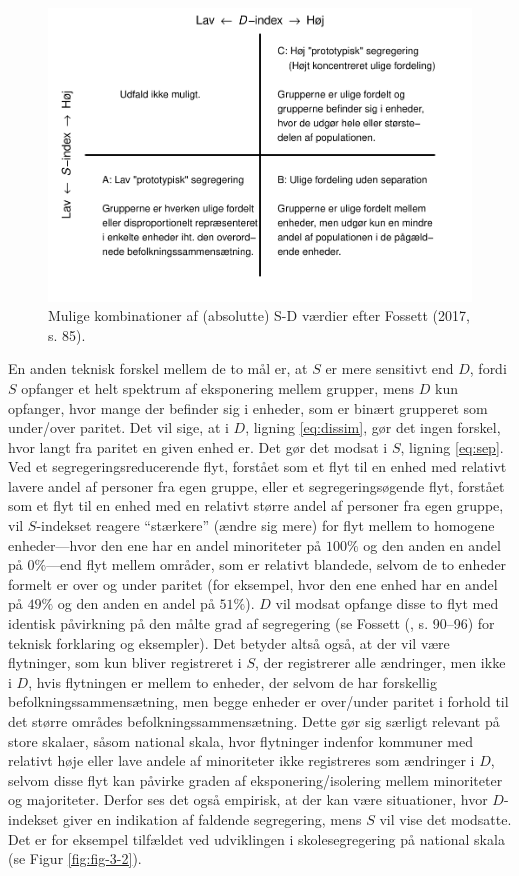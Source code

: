 \documentclass[
]{book}
\begin{document}
\begin{figure}
\includegraphics[width=1\linewidth]{en-befolkning-blander-sig_files/figure-latex/fig-9-4-1} \caption{Mulige kombinationer af (absolutte) S-D værdier efter Fossett (2017, s. 85).}\label{fig:fig-9-4}
\end{figure}

En anden teknisk forskel mellem de to mål er, at \(S\) er mere sensitivt end \(D\), fordi \(S\) opfanger et helt spektrum af eksponering mellem grupper, mens \(D\) kun opfanger, hvor mange der befinder sig i enheder, som er binært grupperet som under/over paritet. Det vil sige, at i \(D\), ligning \eqref{eq:dissim}, gør det ingen forskel, hvor langt fra paritet en given enhed er. Det gør det modsat i \(S\), ligning \eqref{eq:sep}. Ved et segregeringsreducerende flyt, forstået som et flyt til en enhed med relativt lavere andel af personer fra egen gruppe, eller et segregeringsøgende flyt, forstået som et flyt til en enhed med en relativt større andel af personer fra egen gruppe, vil \(S\)-indekset reagere ``stærkere'' (ændre sig mere) for flyt mellem to homogene enheder---hvor den ene har en andel minoriteter på \(100\%\) og den anden en andel på \(0\%\)---end flyt mellem områder, som er relativt blandede, selvom de to enheder formelt er over og under paritet (for eksempel, hvor den ene enhed har en andel på \(49\%\) og den anden en andel på \(51\%\)). \(D\) vil modsat opfange disse to flyt med identisk påvirkning på den målte grad af segregering (se Fossett (, s. 90--96) for teknisk forklaring og eksempler). Det betyder altså også, at der vil være flytninger, som kun bliver registreret i \(S\), der registrerer alle ændringer, men ikke i \(D\), hvis flytningen er mellem to enheder, der selvom de har forskellig befolkningssammensætning, men begge enheder er over/under paritet i forhold til det større områdes befolkningssammensætning. Dette gør sig særligt relevant på store skalaer, såsom national skala, hvor flytninger indenfor kommuner med relativt høje eller lave andele af minoriteter ikke registreres som ændringer i \(D\), selvom disse flyt kan påvirke graden af eksponering/isolering mellem minoriteter og majoriteter. Derfor ses det også empirisk, at der kan være situationer, hvor \(D\)-indekset giver en indikation af faldende segregering, mens \(S\) vil vise det modsatte. Det er for eksempel tilfældet ved udviklingen i skolesegregering på national skala (se Figur \ref{fig:fig-3-2}).
\end{document}
